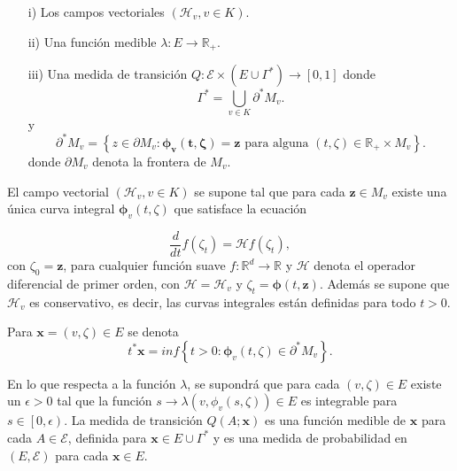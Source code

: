 \documentclass{article}
\newcommand{\rea}{\mathbb{R}}
\numberwithin{equation}{section}
\begin{document}
\begin{itemize}
\item[i)] Los campos vectoriales $\left(\mathcal{H}_{v},v\in K\right)$. \item[ii)] Una funci\'on medible $\lambda:E\rightarrow \rea_{+}$. \item[iii)] Una medida de transici\'on $Q:\mathcal{E}\times\left(E\cup\Gamma^{*}\right)\rightarrow\left[0,1\right]$ donde
\begin{equation}
\Gamma^{*}=\bigcup_{v\in K}\partial^{*}M_{v}.
\end{equation}
y
\begin{equation}
\partial^{*}M_{v}=\left\{z\in\partial M_{v}:\mathbf{\mathbf{\phi}_{v}\left(t,\zeta\right)=\mathbf{z}}\textrm{ para alguna }\left(t,\zeta\right)\in\rea_{+}\times M_{v}\right\}.
\end{equation}
donde $\partial M_{v}$ denota  la frontera de $M_{v}$.
\end{itemize}

El campo vectorial $\left(\mathcal{H}_{v},v\in K\right)$ se supone tal que para cada $\mathbf{z}\in M_{v}$ existe una \'unica curva integral $\mathbf{\phi}_{v}\left(t,\zeta\right)$ que satisface la ecuaci\'on

\begin{equation}
\frac{d}{dt}f\left(\zeta_{t}\right)=\mathcal{H}f\left(\zeta_{t}\right),
\end{equation}
con $\zeta_{0}=\mathbf{z}$, para cualquier funci\'on suave $f:\rea^{d}\rightarrow\rea$ y $\mathcal{H}$ denota el operador diferencial de primer orden, con $\mathcal{H}=\mathcal{H}_{v}$ y $\zeta_{t}=\mathbf{\phi}\left(t,\mathbf{z}\right)$. Adem\'as se supone que $\mathcal{H}_{v}$ es conservativo, es decir, las curvas integrales est\'an definidas para todo $t>0$.

Para $\mathbf{x}=\left(v,\zeta\right)\in E$ se denota \[t^{*}\mathbf{x}=inf\left\{t>0:\mathbf{\phi}_{v}\left(t,\zeta\right)\in\partial^{*}M_{v}\right\}.\]

En lo que respecta a la funci\'on $\lambda$, se supondr\'a que para cada $\left(v,\zeta\right)\in E$ existe un $\epsilon>0$ tal que la funci\'on $s\rightarrow\lambda\left(v,\phi_{v}\left(s,\zeta\right)\right)\in E$ es integrable para $s\in\left[0,\epsilon\right)$. La medida de transici\'on $Q\left(A;\mathbf{x}\right)$ es una funci\'on medible de $\mathbf{x}$ para cada $A\in\mathcal{E}$, definida para $\mathbf{x}\in E\cup\Gamma^{*}$ y es una medida de probabilidad en $\left(E,\mathcal{E}\right)$ para cada $\mathbf{x}\in E$.\\
\end{document}
